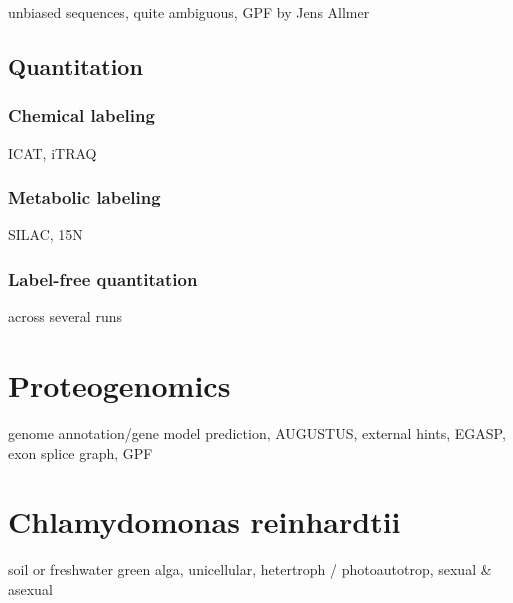 \begin{todo}
unbiased sequences, quite ambiguous, GPF by Jens Allmer
\end{todo}

\subsection{Quantitation}

\subsubsection{Chemical labeling}
 
\begin{todo}
ICAT, iTRAQ
\end{todo}

\subsubsection{Metabolic labeling}

\begin{todo}
SILAC, 15N
\end{todo}

\subsubsection{Label-free quantitation}

\begin{todo}
across several runs
\end{todo}

\section{Proteogenomics}

\begin{todo}
genome annotation/gene model prediction, AUGUSTUS, external hints, 
EGASP, exon splice graph, GPF
\end{todo}

\section{Chlamydomonas reinhardtii}

\begin{todo}
soil or freshwater green alga, unicellular, hetertroph / photoautotrop, sexual & asexual
\end{todo}

